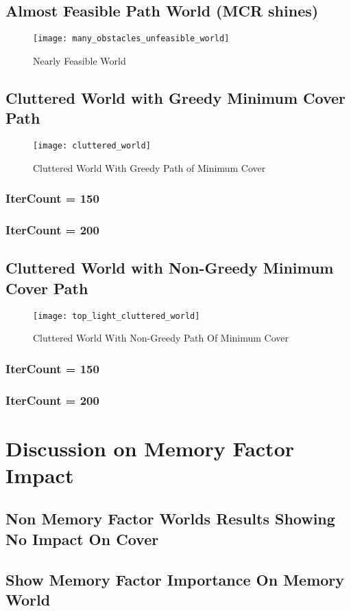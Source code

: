 \subsection{Almost Feasible Path World (MCR shines)}
\begin{figure}[h]
    \centering
    \texttt{[image: many\_obstacles\_unfeasible\_world]}
    \caption{Nearly Feasible World}
    \label{fig:many_obstacles_unfeasible_world}
\end{figure}

\subsection{Cluttered World with Greedy Minimum Cover Path}
\begin{figure}[h]
    \centering
    \texttt{[image: cluttered\_world]}
    \caption{Cluttered World With Greedy Path of Minimum Cover}
    \label{fig:cluttered_world}
\end{figure}
\subsubsection{IterCount = 150}
\subsubsection{IterCount = 200}

\subsection{Cluttered World with Non-Greedy Minimum Cover Path}
\begin{figure}[h]
    \centering
    \texttt{[image: top\_light\_cluttered\_world]}
    \caption{Cluttered World With Non-Greedy Path Of Minimum Cover}
    \label{fig:top_light_cluttered_world}
\end{figure}
\subsubsection{IterCount = 150}
\subsubsection{IterCount = 200}

\section{Discussion on Memory Factor Impact}
\subsection{Non Memory Factor Worlds Results Showing No Impact On Cover}
\subsection{Show Memory Factor Importance On Memory World}







